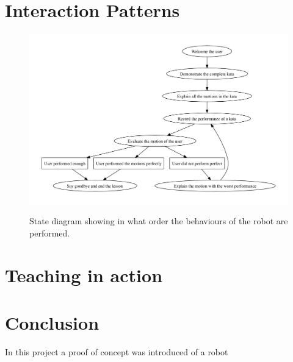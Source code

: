 \documentclass[10pt,a4paper,oneside]{scrartcl}
\begin{document}
\section{Interaction Patterns}


\begin{figure}[!ht]
	\centering
	\includegraphics[width=\textwidth]{images/stateDiagram}
	\label{fig:state-diagram}
	\caption{State diagram showing in what order the behaviours of the robot are performed.}
\end{figure}

\section{Teaching in action}

\section{Conclusion}
In this project a proof of concept was introduced of a robot  


\printbibliography
\end{document}
